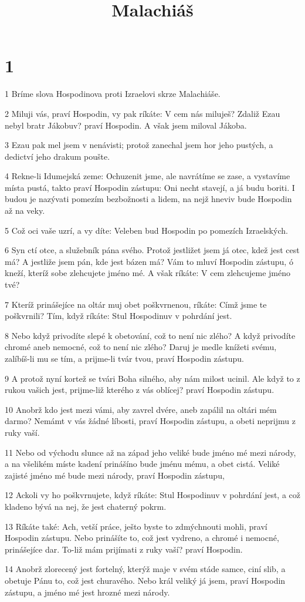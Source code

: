 

\title{Malachiáš}

\chapter{1}

\par 1 Bríme slova Hospodinova proti Izraelovi skrze Malachiáše.
\par 2 Miluji vás, praví Hospodin, vy pak ríkáte: V cem nás miluješ? Zdaliž Ezau nebyl bratr Jákobuv? praví Hospodin. A však jsem miloval Jákoba.
\par 3 Ezau pak mel jsem v nenávisti; protož zanechal jsem hor jeho pustých, a dedictví jeho drakum poušte.
\par 4 Rekne-li Idumejská zeme: Ochuzenit jsme, ale navrátíme se zase, a vystavíme místa pustá, takto praví Hospodin zástupu: Oni necht stavejí, a já budu boriti. I budou je nazývati pomezím bezbožnosti a lidem, na nejž hneviv bude Hospodin až na veky.
\par 5 Což oci vaše uzrí, a vy díte: Veleben bud Hospodin po pomezích Izraelských.
\par 6 Syn ctí otce, a služebník pána svého. Protož jestližet jsem já otec, kdež jest cest má? A jestliže jsem pán, kde jest bázen má? Vám to mluví Hospodin zástupu, ó kneží, kteríž sobe zlehcujete jméno mé. A však ríkáte: V cem zlehcujeme jméno tvé?
\par 7 Kteríž prinášejíce na oltár muj obet poškvrnenou, ríkáte: Címž jsme te poškvrnili? Tím, když ríkáte: Stul Hospodinuv v pohrdání jest.
\par 8 Nebo když privodíte slepé k obetování, což to není nic zlého? A když privodíte chromé aneb nemocné, což to není nic zlého? Daruj je medle knížeti svému, zalíbíš-li mu se tím, a prijme-li tvár tvou, praví Hospodin zástupu.
\par 9 A protož nyní kortež se tvári Boha silného, aby nám milost ucinil. Ale když to z rukou vašich jest, prijme-liž kterého z vás oblícej? praví Hospodin zástupu.
\par 10 Anobrž kdo jest mezi vámi, aby zavrel dvére, aneb zapálil na oltári mém darmo? Nemámt v vás žádné líbosti, praví Hospodin zástupu, a obeti neprijmu z ruky vaší.
\par 11 Nebo od východu slunce až na západ jeho veliké bude jméno mé mezi národy, a na všelikém míste kadení prinášíno bude jménu mému, a obet cistá. Veliké zajisté jméno mé bude mezi národy, praví Hospodin zástupu,
\par 12 Ackoli vy ho poškvrnujete, když ríkáte: Stul Hospodinuv v pohrdání jest, a což kladeno bývá na nej, že jest chaterný pokrm.
\par 13 Ríkáte také: Ach, vetší práce, ješto byste to zdmýchnouti mohli, praví Hospodin zástupu. Nebo prinášíte to, což jest vydreno, a chromé i nemocné, prinášejíce dar. To-liž mám prijímati z ruky vaší? praví Hospodin.
\par 14 Anobrž zlorecený jest fortelný, kterýž maje v svém stáde samce, ciní slib, a obetuje Pánu to, což jest churavého. Nebo král veliký já jsem, praví Hospodin zástupu, a jméno mé jest hrozné mezi národy.

